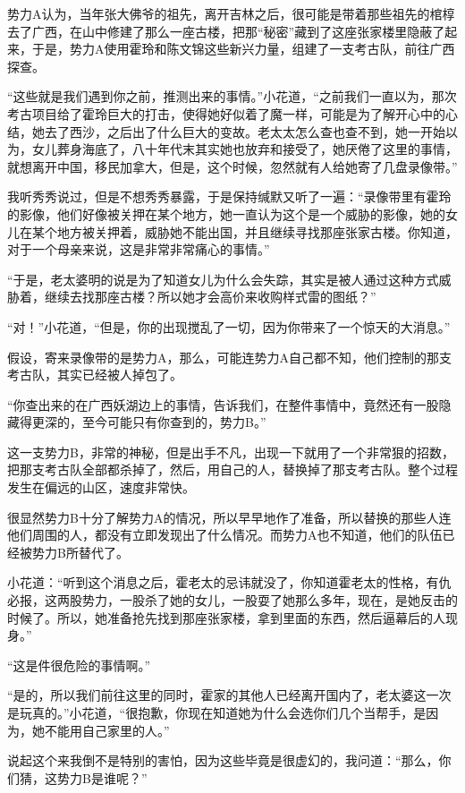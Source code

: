 势力A认为，当年张大佛爷的祖先，离开吉林之后，很可能是带着那些祖先的棺椁去了广西，在山中修建了那么一座古楼，把那“秘密”藏到了这座张家楼里隐蔽了起来，于是，势力A使用霍玲和陈文锦这些新兴力量，组建了一支考古队，前往广西探查。

“这些就是我们遇到你之前，推测出来的事情。”小花道，“之前我们一直以为，那次考古项目给了霍玲巨大的打击，使得她好似着了魔一样，可能是为了解开心中的心结，她去了西沙，之后出了什么巨大的变故。老太太怎么查也查不到，她一开始以为，女儿葬身海底了，八十年代末其实她也放弃和接受了，她厌倦了这里的事情，就想离开中国，移民加拿大，但是，这个时候，忽然就有人给她寄了几盘录像带。”

我听秀秀说过，但是不想秀秀暴露，于是保持缄默又听了一遍：“录像带里有霍玲的影像，他们好像被关押在某个地方，她一直认为这个是一个威胁的影像，她的女儿在某个地方被关押着，威胁她不能出国，并且继续寻找那座张家古楼。你知道，对于一个母亲来说，这是非常非常痛心的事情。”

“于是，老太婆明的说是为了知道女儿为什么会失踪，其实是被人通过这种方式威胁着，继续去找那座古楼？所以她才会高价来收购样式雷的图纸？”

“对！”小花道，“但是，你的出现搅乱了一切，因为你带来了一个惊天的大消息。”

假设，寄来录像带的是势力A，那么，可能连势力A自己都不知，他们控制的那支考古队，其实已经被人掉包了。

“你查出来的在广西妖湖边上的事情，告诉我们，在整件事情中，竟然还有一股隐藏得更深的，至今可能只有你查到的，势力B。”

这一支势力B，非常的神秘，但是出手不凡，出现一下就用了一个非常狠的招数，把那支考古队全部都杀掉了，然后，用自己的人，替换掉了那支考古队。整个过程发生在偏远的山区，速度非常快。

很显然势力B十分了解势力A的情况，所以早早地作了准备，所以替换的那些人连他们周围的人，都没有立即发现出了什么情况。而势力A也不知道，他们的队伍已经被势力B所替代了。

小花道：“听到这个消息之后，霍老太的忌讳就没了，你知道霍老太的性格，有仇必报，这两股势力，一股杀了她的女儿，一股耍了她那么多年，现在，是她反击的时候了。所以，她准备抢先找到那座张家楼，拿到里面的东西，然后逼幕后的人现身。”

“这是件很危险的事情啊。”

“是的，所以我们前往这里的同时，霍家的其他人已经离开国内了，老太婆这一次是玩真的。”小花道，“很抱歉，你现在知道她为什么会选你们几个当帮手，是因为，她不能用自己家里的人。”

说起这个来我倒不是特别的害怕，因为这些毕竟是很虚幻的，我问道：“那么，你们猜，这势力B是谁呢？”

